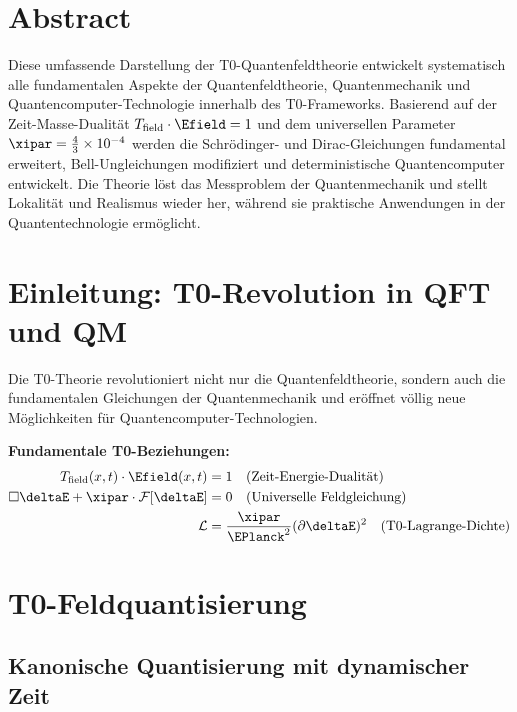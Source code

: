 \section*{Abstract}
		Diese umfassende Darstellung der T0-Quantenfeldtheorie entwickelt systematisch alle fundamentalen Aspekte der Quantenfeldtheorie, Quantenmechanik und Quantencomputer-Technologie innerhalb des T0-Frameworks. Basierend auf der Zeit-Masse-Dualität $T_{\text{field}} \cdot \Efield = 1$ und dem universellen Parameter $\xipar = \frac{4}{3} \times 10^{-4}$ werden die Schrödinger- und Dirac-Gleichungen fundamental erweitert, Bell-Ungleichungen modifiziert und deterministische Quantencomputer entwickelt. Die Theorie löst das Messproblem der Quantenmechanik und stellt Lokalität und Realismus wieder her, während sie praktische Anwendungen in der Quantentechnologie ermöglicht.

	
	
	\section{Einleitung: T0-Revolution in QFT und QM}
	
	Die T0-Theorie revolutioniert nicht nur die Quantenfeldtheorie, sondern auch die fundamentalen Gleichungen der Quantenmechanik und eröffnet völlig neue Möglichkeiten für Quantencomputer-Technologien.
	
	\begin{tcolorbox}[colback=blue!5!white,colframe=blue!75!black,title=T0-Grundprinzipien für QFT und QM]
		\textbf{Fundamentale T0-Beziehungen:}
		\begin{align}
			T_{\text{field}}(x,t) \cdot \Efield(x,t) &= 1 \quad \text{(Zeit-Energie-Dualität)} \\
			\square \deltaE + \xipar \cdot \mathcal{F}[\deltaE] &= 0 \quad \text{(Universelle Feldgleichung)} \\
			\mathcal{L} &= \frac{\xipar}{\EPlanck^2} (\partial \deltaE)^2 \quad \text{(T0-Lagrange-Dichte)}
		\end{align}
	\end{tcolorbox}
	
	\section{T0-Feldquantisierung}
	
	\subsection{Kanonische Quantisierung mit dynamischer Zeit}
	
